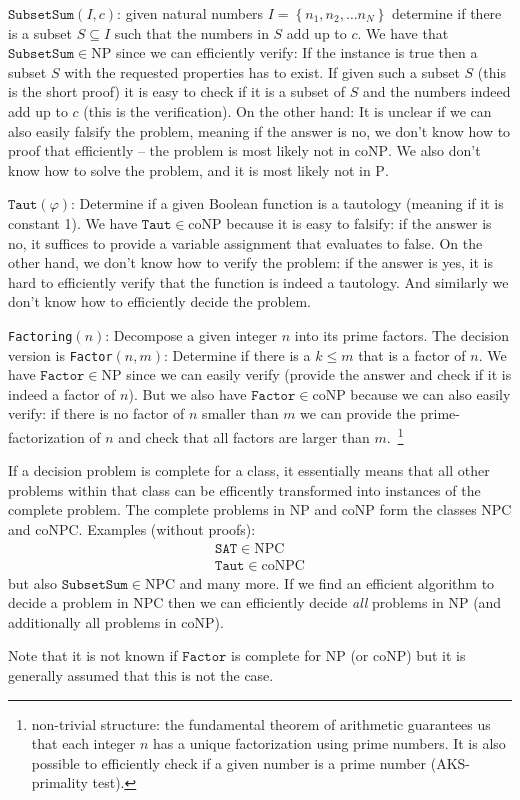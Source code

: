$\texttt{SubsetSum}(I,c)$: given natural numbers $I=\left\{n_1,n_2,\dots n_N\right\}$ determine if there is a subset $S\subseteq I$ such that the numbers in $S$ add up to $c$. We have that $\texttt{SubsetSum}\in \mathrm{NP}$ since we can efficiently verify: If the instance is true then a subset $S$ with the requested properties has to exist. If given such a subset $S$ (this is the short proof) it is easy to check if it is a subset of $S$ and the numbers indeed add up to $c$ (this is the verification). On the other hand: It is unclear if we can also easily falsify the problem, meaning if the answer is no, we don't know how to proof that efficiently -- the problem is most likely not in $\mathrm{coNP}$. We also don't know how to solve the problem, and it is most likely not in $\mathrm{P}$.

$\texttt{Taut}(\varphi)$: Determine if a given Boolean function is a tautology (meaning if it is constant 1). We have $\texttt{Taut}\in \mathrm{coNP}$ because it is easy to falsify: if the answer is no, it suffices to provide a variable assignment that evaluates to false. On the other hand, we don't know how to verify the problem: if the answer is yes, it is hard to efficiently verify that the function is indeed a tautology. And similarly we don't know how to efficiently decide the problem.

\texttt{Factoring}$(n)$: Decompose a given integer $n$ into its prime factors. The decision version is \texttt{Factor}$(n,m)$: Determine if there is a $k\leq m$ that is a factor of $n$. We have $\texttt{Factor}\in \mathrm{NP}$ since we can easily verify (provide the answer and check if it is indeed a factor of $n$). But we also have $\texttt{Factor}\in \mathrm{coNP}$ because we can also easily verify: if there is no factor of $n$ smaller than $m$ we can provide the prime-factorization of $n$ and check that all factors are larger than $m$.~\footnote{non-trivial structure: the fundamental theorem of arithmetic guarantees us that each integer $n$ has a unique factorization using prime numbers. It is also possible to efficiently check if a given number is a prime number (AKS-primality test).}

\begin{def*} If a decision problem is complete for a class, it essentially means that all other problems within that class can be efficently transformed into instances of the complete problem. The complete problems in $\mathrm{NP}$ and $\mathrm{coNP}$ form the classes $\mathrm{NPC}$ and $\mathrm{coNPC}$. Examples (without proofs):
\begin{align*}
    \texttt{SAT} \in \mathrm{NPC}\\
    \texttt{Taut} \in \mathrm{coNPC}
\end{align*}
but also $\texttt{SubsetSum} \in \mathrm{NPC}$ and many more. If we find an efficient algorithm to decide a problem in $\mathrm{NPC}$ then we can efficiently decide \textit{all} problems in $\mathrm{NP}$ (and additionally all problems in $\mathrm{coNP}$). 
\end{def*}
Note that it is not known if $\texttt{Factor}$ is complete for $\mathrm{NP}$ (or $\mathrm{coNP}$) but it is generally assumed that this is not the case. 



